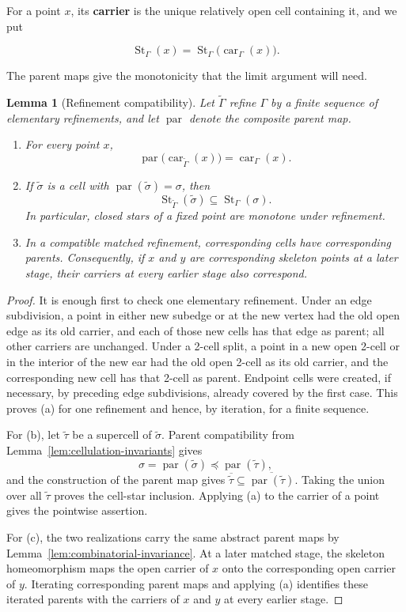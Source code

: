 \documentclass[11pt]{article}
\theoremstyle{mainplain}
\theoremstyle{mainroman}
\newtheorem{longlemma}[theorem]{Lemma}
\theoremstyle{definition}
\newcommand{\alphlabels}{\renewcommand{\labelenumi}{\textup{(\alph{enumi})}}%
  \renewcommand{\theenumi}{\alph{enumi}}}
\numberwithin{equation}{section}
\begin{document}
For a point \(x\), its \textbf{carrier} is the unique relatively open
cell containing it, and we put

\[
\operatorname{St}_{\Gamma}(x)
 =
\operatorname{St}_{\Gamma}
  \bigl(\operatorname{car}_{\Gamma}(x)\bigr).
\]

The parent maps give the monotonicity that the limit argument will need.

\begin{longlemma}[Refinement compatibility]\label{lem:refinement-compatibility}
Let $\widetilde\Gamma$ refine $\Gamma$ by a finite sequence of elementary
refinements, and let $\operatorname{par}$ denote the composite parent
map.
\begin{enumerate}\alphlabels
\item For every point $x$,
\[
 \operatorname{par}\bigl(\operatorname{car}_{\widetilde\Gamma}(x)\bigr)
 =\operatorname{car}_{\Gamma}(x).
\]
\item If $\widetilde\sigma$ is a cell with
$\operatorname{par}(\widetilde\sigma)=\sigma$, then
\[
 \operatorname{St}_{\widetilde\Gamma}(\widetilde\sigma)
 \subseteq \operatorname{St}_{\Gamma}(\sigma).
\]
In particular, closed stars of a fixed point are monotone under
refinement.
\item In a compatible matched refinement, corresponding cells have
corresponding parents. Consequently, if $x$ and $y$ are corresponding
skeleton points at a later stage, their carriers at every earlier stage
also correspond.
\end{enumerate}
\end{longlemma}
\begin{proof}
It is enough first to check one elementary refinement. Under an edge
subdivision, a point in either new subedge or at the new vertex had the
old open edge as its old carrier, and each of those new cells has that
edge as parent; all other carriers are unchanged. Under a 2-cell split,
a point in a new open 2-cell or in the interior of the new ear had the
old open 2-cell as its old carrier, and the corresponding new cell has
that 2-cell as parent. Endpoint cells were created, if necessary, by
preceding edge subdivisions, already covered by the first case. This
proves (a) for one refinement and hence, by iteration, for a finite
sequence.

For (b), let $\widetilde\tau$ be a supercell of
$\widetilde\sigma$. Parent compatibility from
Lemma~\ref{lem:cellulation-invariants} gives
\[
 \sigma=\operatorname{par}(\widetilde\sigma)
 \preceq \operatorname{par}(\widetilde\tau),
\]
and the construction of the parent map gives
$\overline{\widetilde\tau}\subseteq
\overline{\operatorname{par}(\widetilde\tau)}$. Taking the union over
all $\widetilde\tau$ proves the cell-star inclusion. Applying (a) to
the carrier of a point gives the pointwise assertion.

For (c), the two realizations carry the same abstract parent maps by
Lemma~\ref{lem:combinatorial-invariance}. At a later matched stage, the
skeleton homeomorphism maps the open carrier of $x$ onto the
corresponding open carrier of $y$. Iterating corresponding parent maps
and applying (a) identifies these iterated parents with the carriers of
$x$ and $y$ at every earlier stage.
\end{proof}
\end{document}
